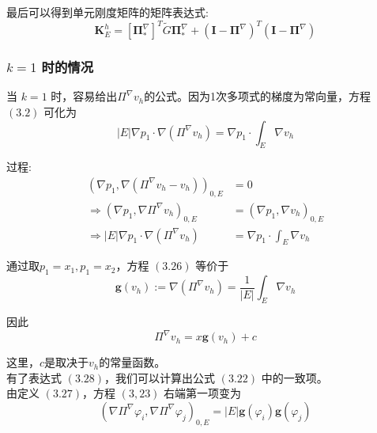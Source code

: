 最后可以得到单元刚度矩阵的矩阵表达式: \\
\begin{equation}
\mathbf K_E^h = [\boldsymbol \Pi^\nabla_{*}]^T \tilde{G} \boldsymbol \Pi_{*}^\nabla + (\mathbf I - \boldsymbol \Pi^\nabla)^T(\mathbf I - \boldsymbol \Pi^\nabla)
\end{equation}

\subsubsection{$k = 1$ 时的情况}

当 $k=1$ 时，容易给出$\Pi^{\nabla} v_h$的公式。因为1次多项式的梯度为常向量，方程 $(3.2)$ 可化为 \\
\begin{equation}
|E| \nabla p_1 \cdot \nabla(\Pi^{\nabla}v_h) = \nabla p_1 \cdot \int_E \nabla v_h
\end{equation}

过程: \\
\begin{equation*}
\begin{aligned}
(\nabla p_1, \nabla(\Pi^\nabla v_h - v_h))_{0,E} & = 0 \\
\Rightarrow
(\nabla p_1, \nabla\Pi^\nabla v_h)_{0,E} & = (\nabla p_1, \nabla v_h)_{0,E} \\
\Rightarrow
|E| \nabla p_1 \cdot \nabla(\Pi^{\nabla}v_h) & = \nabla p_1 \cdot \int_E \nabla v_h
\end{aligned}
\end{equation*}

通过取$p_1 = x_1,p_1 =x_2$，方程 $(3.26)$ 等价于 \\
\begin{equation}
\mathbf g(v_h) := \nabla(\Pi^{\nabla} v_h) = \frac{1}{|E|} \int_E \nabla v_h
\end{equation}

因此 \\
\begin{equation}
\Pi^{\nabla} v_h = x\mathbf g(v_h) + c
\end{equation}

这里，$c$是取决于$v_h$的常量函数。\\

有了表达式 $(3.28)$，我们可以计算出公式 $(3.22)$ 中的一致项。\\

由定义 $(3.27)$，方程 $(3,23)$ 右端第一项变为 \\
\begin{equation*}
(\nabla\Pi^{\nabla} \varphi_i,\nabla\Pi^{\nabla} \varphi_j)_{0,E}=|E|\mathbf g(\varphi_i)\mathbf g(\varphi_j)
\end{equation*}


